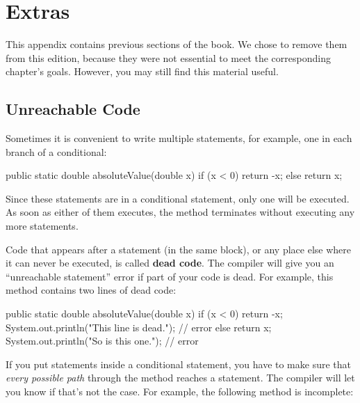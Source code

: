 \chapter{Extras}
\label{extras}

This appendix contains previous sections of the book.
We chose to remove them from this edition, because they were not essential to meet the corresponding chapter's goals.
However, you may still find this material useful.



\section{Unreachable Code}

Sometimes it is convenient to write multiple  statements, for example, one in each branch of a conditional:

\begin{code}
public static double absoluteValue(double x) {
    if (x < 0) {
        return -x;
    } else {
        return x;
    }
}
\end{code}

Since these  statements are in a conditional statement, only one will be executed.
As soon as either of them executes, the method terminates without executing any more statements.


Code that appears after a  statement (in the same block), or any place else where it can never be executed, is called {\bf dead code}.
The compiler will give you an ``unreachable statement'' error if part of your code is dead.
For example, this method contains two lines of dead code:

\begin{code}
public static double absoluteValue(double x) {
    if (x < 0) {
        return -x;
        System.out.println("This line is dead.");  // error
    } else {
        return x;
    }
    System.out.println("So is this one.");  // error
}
\end{code}

If you put  statements inside a conditional statement, you have to make sure that {\em every possible path} through the method reaches a  statement.
The compiler will let you know if that's not the case.
For example, the following method is incomplete:

